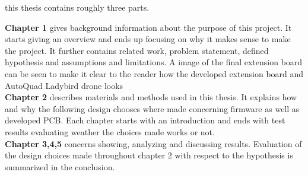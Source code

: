 this thesis contains roughly three parts.

\textbf{Chapter 1} gives background information about the purpose of this project. It starts giving an overview and ends up focusing on why it makes sense to make the project. It further contains related work,  problem statement, defined hypothesis and assumptions and limitations. A image of the final extension board can be seen to make it clear to the reader how the developed extension board and AutoQuad Ladybird drone looks\\

\textbf{Chapter 2} describes materials and methods used in this thesis. It explains how and why the following design chooses where made concerning firmware as well as developed PCB. Each chapter starts with an introduction and ends with test results evaluating weather the choices made works or not.\\

\textbf{Chapter 3,4,5} concerns showing, analyzing and discussing results. Evaluation of the design choices made throughout chapter 2 with respect to the hypothesis is summarized in the conclusion. \\

